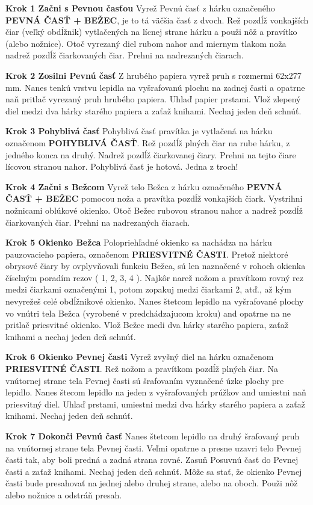 \begin{multicols*}{3}
{  \textbf{Krok 1 Začni s Pevnou časťou} Vyrež Pevnú časť z hárku označeného \textbf{PEVNÁ ČASŤ + BEŽEC}, je to tá väčšia časť z dvoch. Rež pozdĺž vonkajších čiar (veľký obdĺžnik) vytlačených na lícnej strane hárku a použi nôž a pravítko (alebo nožnice). Otoč vyrezaný diel rubom nahor and miernym tlakom noža nadrež pozdĺž čiarkovaných čiar. Prehni na nadrezaných čiarach.

  \textbf{Krok 2 Zosilni Pevnú časť} Z hrubého papiera vyrež pruh s rozmermi 62x277 mm. Nanes tenkú vrstvu lepidla na vyšrafovanú plochu na zadnej časti a opatrne naň pritlač vyrezaný pruh hrubého papiera. Uhlaď papier prstami. Vlož zlepený diel medzi dva hárky starého papiera a zaťaž knihami. Nechaj jeden deň schnúť.

  \textbf{Krok 3 Pohyblivá časť} Pohyblivá časť pravítka je vytlačená na hárku označenom \textbf{POHYBLIVÁ ČASŤ}. Rež pozdĺž plných čiar na rube hárku, z jedného konca na druhý. Nadrež pozdĺž čiarkovanej čiary. Prehni na tejto čiare lícovou stranou nahor. Pohyblivá časť je hotová. Jedna z troch!

  \textbf{Krok 4 Začni s Bežcom} Vyrež telo Bežca z hárku označeného \textbf{PEVNÁ ČASŤ + BEŽEC} pomocou noža a pravítka pozdĺž vonkajších čiark. Vystrihni nožnicami oblúkové okienko. Otoč Bežec rubovou stranou nahor a nadrež pozdĺž čiarkovaných čiar. Prehni na nadrezaných čiarach.

  \textbf{Krok 5 Okienko Bežca} Polopriehľadné okienko sa nachádza na hárku pauzovacieho papiera, označenom \textbf{PRIESVITNÉ ČASTI}. Pretož niektoré obrysové čiary by ovplyvňovali funkciu Bežca, sú len naznačené v rohoch okienka číselným poradím rezov ( 1, 2, 3, 4 ). Najkôr narež nožom a pravítkom rovný rez medzi čiarkami označenými 1, potom zopakuj medzi čiarkami 2, atď., až kým nevyrežeš celé obdĺžnikové okienko. Nanes štetcom lepidlo na vyšrafované plochy vo vnútri tela Bežca (vyrobené v predchádzajucom kroku) and opatrne na ne pritlač priesvitné okienko. Vlož Bežec medi dva hárky starého papiera, zaťaž knihami a nechaj jeden deň schnúť.

  \textbf{Krok 6 Okienko Pevnej časti} Vyrež zvyšný diel na hárku označenom \textbf{PRIESVITNÉ ČASTI}. Rež nožom a pravítkom pozdĺž plných čiar. Na vnútornej strane tela Pevnej časti sú šrafovaním vyznačené úzke plochy pre lepidlo. Nanes štecom lepidlo na jeden z vyšrafovaných prúžkov and umiestni naň priesvitný diel. Uhlaď prstami, umiestni medzi dva hárky starého papiera a zaťaž knihami. Nechaj jeden deň schnúť.

  \textbf{Krok 7 Dokonči Pevnú časť} Nanes štetcom lepidlo na druhý šrafovaný pruh na vnútornej strane tela Pevnej časti. Veľmi opatrne a presne uzavri telo Pevnej časti tak, aby boli predná a zadná strana rovné. Zasuň Posuvnú časť do Pevnej časti a zaťaž knihami. Nechaj jeden deň schnúť.
Môže sa stať, že okienko Pevnej časti bude presahovať na jednej alebo druhej strane, alebo na oboch. Použi nôž alebo nožnice a odstráň presah.

}
\end{multicols*}
